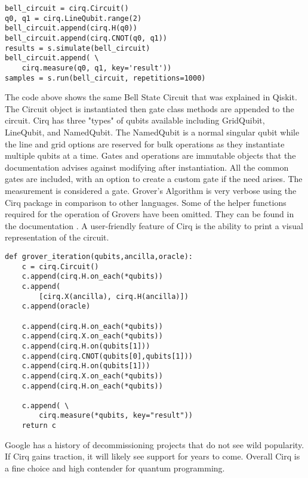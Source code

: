 \documentclass[conference]{IEEEtran}
\begin{document}
\begin{verbatim}
bell_circuit = cirq.Circuit()
q0, q1 = cirq.LineQubit.range(2)
bell_circuit.append(cirq.H(q0))
bell_circuit.append(cirq.CNOT(q0, q1))
results = s.simulate(bell_circuit)
bell_circuit.append( \
    cirq.measure(q0, q1, key='result'))
samples = s.run(bell_circuit, repetitions=1000)
\end{verbatim}

The code above shows the same Bell State Circuit that was explained in Qiskit. 
The Circuit object is instantiated then gate class methods are appended to the circuit. 
Cirq has three "types" of qubits available including GridQuibit, LineQubit, and NamedQubit. 
The NamedQubit is a normal singular qubit while the line and grid options are reserved for bulk operations as they instantiate multiple qubits at a time. 
Gates and operations are immutable objects that the documentation advises against modifying after instantiation. 
All the common gates are included, with an option to create a custom gate if the need arises. 
The measurement is considered a gate.
Grover's Algorithm is very verbose using the Cirq package in comparison to other languages. 
Some of the helper functions required for the operation of Grovers have been omitted. 
They can be found in the documentation \cite{b10}. 
A user-friendly feature of Cirq is the ability to print a visual representation of the circuit.
\begin{verbatim}
def grover_iteration(qubits,ancilla,oracle):
    c = cirq.Circuit()
    c.append(cirq.H.on_each(*qubits))
    c.append( 
        [cirq.X(ancilla), cirq.H(ancilla)])
    c.append(oracle)

    c.append(cirq.H.on_each(*qubits))
    c.append(cirq.X.on_each(*qubits))
    c.append(cirq.H.on(qubits[1]))
    c.append(cirq.CNOT(qubits[0],qubits[1]))
    c.append(cirq.H.on(qubits[1]))
    c.append(cirq.X.on_each(*qubits))
    c.append(cirq.H.on_each(*qubits))

    c.append( \
        cirq.measure(*qubits, key="result"))
    return c
\end{verbatim}
Google has a history of decommissioning projects that do not see wild popularity.
If Cirq gains traction, it will likely see support for years to come.
Overall Cirq is a fine choice and high contender for quantum programming. 
\end{document}
